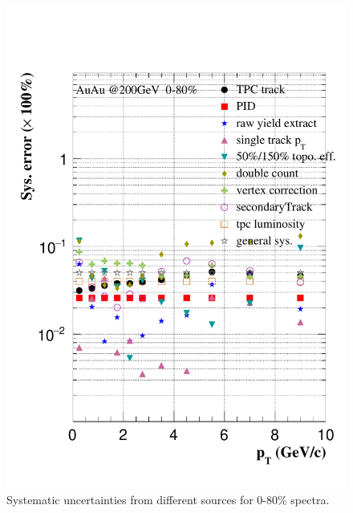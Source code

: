 \begin{figure}[htbp]
\begin{minipage}[htbp]{0.47\linewidth}
\includegraphics[width=1.0\textwidth,angle=0]{figure/Run14_D0HFT/sysErr_0_80_2.pdf} 
\caption{ Systematic uncertainties from different sources for 0-80\% spectra. \label{sysErr_0_80}}
\end{minipage}
\end{figure}

